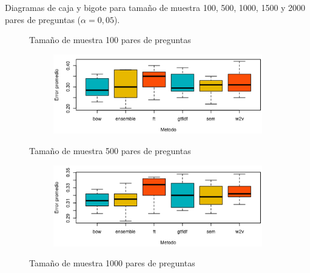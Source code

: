 \begin{frame}
	Diagramas de caja y bigote para tamaño de muestra 100, 500, 1000, 1500 y 2000 pares de preguntas (\(\alpha = 0,05\)).
	\begin{figure}[!htb]
		\centering
		\begin{minipage}{.45\textwidth}
			\begin{tiny}
			Tamaño de muestra 100 pares de preguntas
			\end{tiny}
			\begin{figure}
				\vspace*{-0.3cm}
				\centering
				\includegraphics[width=\textwidth]{../10_resultados/imagenes/anova_100}
			\end{figure}
		\end{minipage}%
		\begin{minipage}{.45\textwidth}
			\begin{tiny}
				Tamaño de muestra 500 pares de preguntas
			\end{tiny}
			\begin{figure}
				\vspace*{-0.3cm}
				\centering
				\includegraphics[width=\textwidth]{../10_resultados/imagenes/anova_500}
			\end{figure}
		\end{minipage}
		\begin{minipage}{.45\textwidth}
			\begin{tiny}
				Tamaño de muestra 1000 pares de preguntas
			\end{tiny}
			\begin{figure}

\end{figure}
\end{minipage}
\end{figure}
\end{frame}
